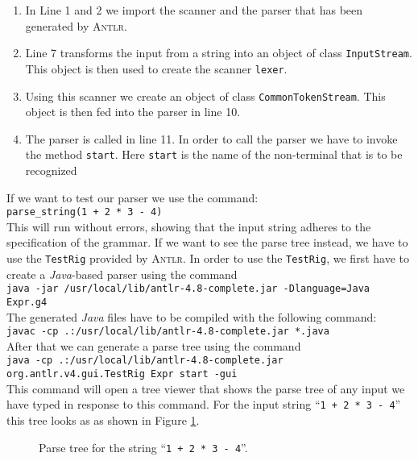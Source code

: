 \begin{enumerate}
\item In Line 1 and 2 we import the scanner and the parser that has been generated by \textsc{Antlr}.
\item Line 7 transforms the input from a string into an object of class \texttt{InputStream}.
      This object is then used to create the scanner \texttt{lexer}.
\item Using this scanner we create an object of class \texttt{CommonTokenStream}.
      This object is then fed into the parser in line 10.
\item The parser is called in line 11.  In order to call the parser we have to invoke the method 
      \texttt{start}.  Here \texttt{start} is the name of the non-terminal that is to be recognized
\end{enumerate}
If we want to test our parser we use the command:
\\[0.2cm]
\hspace*{1.3cm}
\texttt{parse\_string(1 + 2 * 3 - 4)}
\\[0.2cm]
This will run without errors, showing that the input string adheres to the specification of the grammar.
If we want to see the parse tree instead, we have to use the \texttt{TestRig} provided by \textsc{Antlr}.
In order to use the \texttt{TestRig}, we first have to create a \textsl{Java}-based parser using the command
\\[0.2cm]
\hspace*{1.3cm}
\texttt{java -jar /usr/local/lib/antlr-4.8-complete.jar -Dlanguage=Java Expr.g4}
\\[0.2cm]
The generated \textsl{Java} files have to be compiled with the following command:
\\[0.2cm]
\hspace*{1.3cm}
\texttt{javac -cp .:/usr/local/lib/antlr-4.8-complete.jar *.java}
\\[0.2cm]
After that we can generate a parse tree using the command
\\[0.2cm]
\hspace*{0.3cm}
\texttt{java -cp .:/usr/local/lib/antlr-4.8-complete.jar org.antlr.v4.gui.TestRig Expr start -gui}
\\[0.2cm]
This command will open a tree viewer that shows the parse tree of any input we have typed in response to this command.
For the input string ``\texttt{1 + 2 * 3 - 4}''  this tree looks as as shown in Figure \ref{fig:expr.eps}.

\begin{figure}[!ht]
  \centering
   \caption{Parse tree for the string ``\texttt{1 + 2 * 3 - 4}''.}
  \label{fig:expr.eps}
\end{figure}



